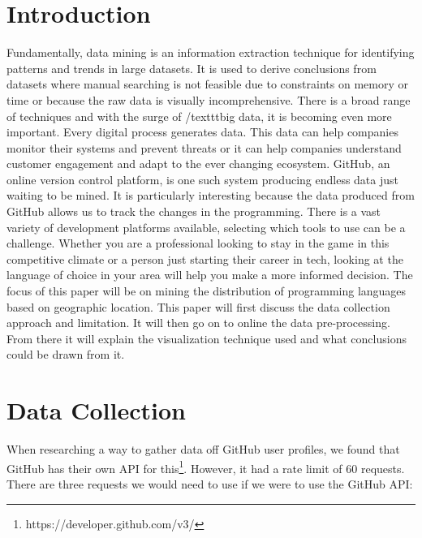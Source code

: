 \documentclass[11pt]{article}
\begin{document}
\section{Introduction}
Fundamentally, data mining is an information extraction technique for identifying patterns and trends in large datasets. It is used to derive conclusions from datasets where manual searching is not feasible due to constraints on memory or time or because the raw data is visually incomprehensive. There is a broad range of techniques and with the surge of /texttt{big data}, it is becoming even more important. Every digital process generates data. This data can help companies monitor their systems and prevent threats or it can help companies understand customer engagement and adapt to the ever changing ecosystem. GitHub, an online version control platform, is one such system producing endless data just waiting to be mined. It is particularly interesting because the data produced from GitHub allows us to track the changes in the programming. There is a vast variety of development platforms available, selecting which tools to use can be a challenge. Whether you are a professional looking to stay in the game in this competitive climate or a person just starting their career in tech, looking at the language of choice in your area will help you make a more informed decision. The focus of this paper will be on mining the distribution of programming languages based on geographic location. This paper will first discuss the data collection approach and limitation. It will then go on to online the data pre-processing. From there it will explain the visualization technique used and what conclusions could be drawn from it.

\section{Data Collection}
When researching a way to gather data off GitHub user profiles, we found that GitHub has their own API for this\footnote{https://developer.github.com/v3/}. However, it had a rate limit of 60 requests. There are three requests we would need to use if we were to use the GitHub API:
\end{document}
